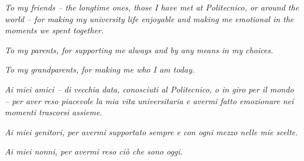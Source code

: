 \vspace{17cm}

\hfill
\begin{minipage}[t]{0.7\textwidth}
\begin{flushright}
\textit{To my friends -- the longtime ones, those I have met at Politecnico, or around the world -- for making my university life enjoyable and making me emotional in the moments we spent together.}\vspace{5mm}

\textit{To my parents, for supporting me always and by any means in my choices.}\vspace{5mm}

\textit{To my grandparents, for making me who I am today.}\vspace{2cm}

\textit{Ai miei amici -- di vecchia data, conosciuti al Politecnico, o in giro per il mondo -- per aver reso piacevole la mia vita universitaria e avermi fatto emozionare nei momenti trascorsi assieme.}\vspace{5mm}

\textit{Ai miei genitori, per avermi supportato sempre e con ogni mezzo nelle mie scelte.}\vspace{5mm}

\textit{Ai miei nonni, per avermi reso ci\`{o} che sono oggi.}
\end{flushright}
\end{minipage}
